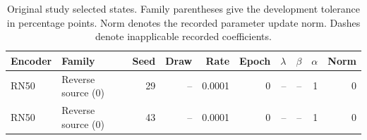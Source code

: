 \begin{table}[t]
\centering
\scriptsize
\setlength{\tabcolsep}{3pt}
\begin{tabular}{llrrrrrrrr}
\toprule
Encoder & Family & Seed & Draw & Rate & Epoch & $\lambda$ & $\beta$ & $\alpha$ & Norm\\
\midrule
RN50 & Reverse source (0) & 29 & -- & 0.0001 & 0 & -- & -- & 1 & 0\\
RN50 & Reverse source (0) & 43 & -- & 0.0001 & 0 & -- & -- & 1 & 0\\
\bottomrule
\end{tabular}
\caption{Original study selected states. Family parentheses give the development tolerance in percentage points. Norm denotes the recorded parameter update norm. Dashes denote inapplicable recorded coefficients.}\label{tab:originalselected100}
\end{table}


\clearpage

